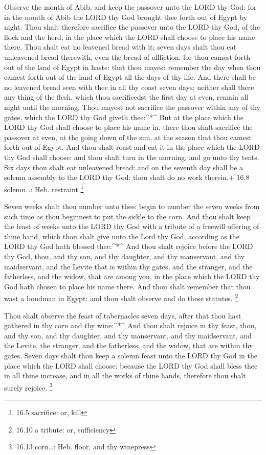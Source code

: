 Observe the month of Abib, and keep the passover unto the
LORD thy God: for in the month of Abib the LORD thy God brought thee
forth out of Egypt by night.  Thou shalt therefore sacrifice
the passover unto the LORD thy God, of the flock and the herd, in the
place which the LORD shall choose to place his name there. 
Thou shalt eat no leavened bread with it; seven days shalt thou eat
unleavened bread therewith, even the bread of affliction; for thou
camest forth out of the land of Egypt in haste: that thou mayest
remember the day when thou camest forth out of the land of Egypt all the
days of thy life.  And there shall be no leavened bread seen
with thee in all thy coast seven days; neither shall there any thing of
the flesh, which thou sacrificedst the first day at even, remain all
night until the morning.  Thou mayest not sacrifice the
passover within any of thy gates, which the LORD thy God giveth
thee:\^{}*\^{}  But at the place which the LORD thy God
shall choose to place his name in, there thou shalt sacrifice the
passover at even, at the going down of the sun, at the season that thou
camest forth out of Egypt.  And thou shalt roast and eat it
in the place which the LORD thy God shall choose: and thou shalt turn in
the morning, and go unto thy tents.  Six days thou shalt eat
unleavened bread: and on the seventh day shall be a solemn assembly to
the LORD thy God: thou shalt do no work therein.+ 16.8 solemn\ldots:
Heb. restraint \footnote{16.5 sacrifice: or, kill}

 Seven weeks shalt thou number unto thee: begin to number
the seven weeks from such time as thou beginnest to put the sickle to
the corn.  And thou shalt keep the feast of weeks unto the
LORD thy God with a tribute of a freewill offering of thine hand, which
thou shalt give unto the Lord thy God, according as the LORD thy God
hath blessed thee:\^{}*\^{}  And thou shalt rejoice before
the LORD thy God, thou, and thy son, and thy daughter, and thy
manservant, and thy maidservant, and the Levite that is within thy
gates, and the stranger, and the fatherless, and the widow, that are
among you, in the place which the LORD thy God hath chosen to place his
name there.  And thou shalt remember that thou wast a
bondman in Egypt: and thou shalt observe and do these statutes.
\footnote{16.10 a tribute: or, sufficiency}

 Thou shalt observe the feast of tabernacles seven days,
after that thou hast gathered in thy corn and thy wine:\^{}*\^{}
 And thou shalt rejoice in thy feast, thou, and thy son,
and thy daughter, and thy manservant, and thy maidservant, and the
Levite, the stranger, and the fatherless, and the widow, that are within
thy gates.  Seven days shalt thou keep a solemn feast unto
the LORD thy God in the place which the LORD shall choose: because the
LORD thy God shall bless thee in all thine increase, and in all the
works of thine hands, therefore thou shalt surely rejoice. \footnote{16.13
  corn\ldots: Heb. floor, and thy winepress}

